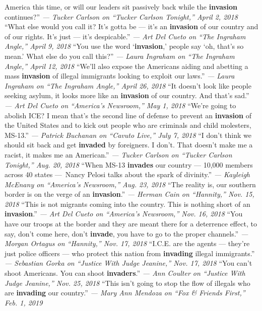 America this time, or will our leaders sit passively back while the
\textbf{invasion} continues?'' \emph{--- Tucker Carlson on ``Tucker
Carlson Tonight,'' April 2, 2018} ``What else would you call it? It's
gotta be --- it's an \textbf{invasion} of our country and of our rights.
It's just --- it's despicable.'' \emph{--- Art Del Cueto on ``The
Ingraham Angle,'' April 9, 2018} ``You use the word `\textbf{invasion},'
people say `oh, that's so mean.' What else do you call this?'' \emph{---
Laura Ingraham on ``The Ingraham Angle,'' April 12, 2018} ``We'll also
expose the Americans aiding and abetting a mass \textbf{invasion} of
illegal immigrants looking to exploit our laws.'' \emph{--- Laura
Ingraham on ``The Ingraham Angle,'' April 26, 2018} ``It doesn't look
like people seeking asylum, it looks more like an \textbf{invasion} of
our country. And that's sad.'' \emph{--- Art Del Cueto on ``America's
Newsroom,'' May 1, 2018} ``We're going to abolish ICE? I mean that's the
second line of defense to prevent an \textbf{invasion} of the United
States and to kick out people who are criminals and child molesters,
MS-13.'' \emph{--- Patrick Buchanan on ``Cavuto Live,'' July 7, 2018}
``I don't think we should sit back and get \textbf{invaded} by
foreigners. I don't. That doesn't make me a racist, it makes me an
American.'' \emph{--- Tucker Carlson on ``Tucker Carlson Tonight,'' Aug.
20, 2018} ``When MS-13 \textbf{invades} our country --- 10,000 members
across 40 states ---~Nancy Pelosi talks about the spark of divinity.''
\emph{--- Kayleigh McEnany on ``America's Newsroom,'' Aug. 23, 2018}
``The reality is, our southern border is on the verge of an
\textbf{invasion}.'' \emph{--- Herman Cain on ``Hannity,'' Nov. 15,
2018} ``This is not migrants coming into the country. This is nothing
short of an \textbf{invasion}.'' \emph{--- Art Del Cueto on ``America's
Newsroom,'' Nov. 16, 2018} ``You have our troops at the border and they
are meant there for a deterrence effect, to say, don't come here, don't
\textbf{invade}, you have to go to the proper channels.'' \emph{---
Morgan Ortagus on ``Hannity,'' Nov. 17, 2018} ``I.C.E. are the agents
--- they're just police officers --- who protect this nation from
\textbf{invading} illegal immigrants.'' \emph{--- Sebastian Gorka on
``Justice With Judge Jeanine,'' Nov. 17, 2018} ``You can't shoot
Americans. You can shoot \textbf{invaders}.'' \emph{--- Ann Coulter on
``Justice With Judge Jeanine,'' Nov. 25, 2018} ``This isn't going to
stop the flow of illegals who are \textbf{invading} our country.''
\emph{--- Mary Ann Mendoza on ``Fox \& Friends First,'' Feb. 1, 2019}
